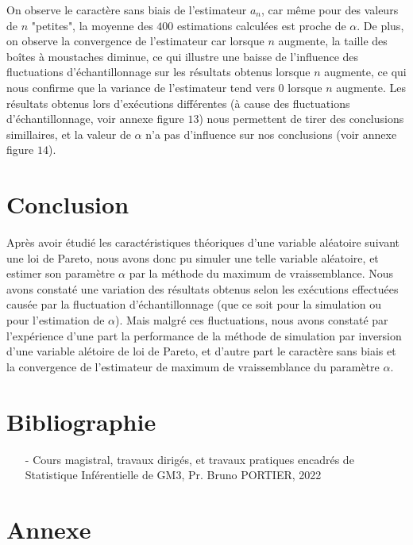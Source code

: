 \documentclass{article}
\begin{document}
On observe le caractère sans biais de l'estimateur $a_n$, car même pour des valeurs de $n$ "petites", la moyenne des $400$ estimations calculées est proche de $\alpha$. De plus, on observe la convergence de l'estimateur car lorsque $n$ augmente, la taille des boîtes à moustaches diminue, ce qui illustre une baisse de l'influence des fluctuations d'échantillonnage sur les résultats obtenus lorsque $n$ augmente, ce qui nous confirme que la variance de l'estimateur tend vers $0$ lorsque $n$ augmente. Les résultats obtenus lors d'exécutions différentes (à cause des fluctuations d'échantillonnage, voir annexe figure $13$) nous permettent de tirer des conclusions simillaires, et la valeur de $\alpha$ n'a pas d'influence sur nos conclusions (voir annexe figure $14$).

\pagebreak

\section{Conclusion}

Après avoir étudié les caractéristiques théoriques d'une variable aléatoire suivant une loi de Pareto, nous avons donc pu simuler une telle variable aléatoire, et estimer son paramètre $\alpha$ par la méthode du maximum de vraissemblance. Nous avons constaté une variation des résultats obtenus selon les exécutions effectuées causée par la fluctuation d'échantillonnage (que ce soit pour la simulation ou pour l'estimation de $\alpha$). Mais malgré ces fluctuations, nous avons constaté par l'expérience d'une part la performance de la méthode de simulation par inversion d'une variable alétoire de loi de Pareto, et d'autre part le caractère sans biais et la convergence de l'estimateur de maximum de vraissemblance du paramètre $\alpha$. 

\section{Bibliographie}

\begin{itemize}
\item[-] Cours magistral, travaux dirigés, et travaux pratiques encadrés de Statistique Inférentielle de GM3, Pr. Bruno PORTIER, 2022
\end{itemize}

\pagebreak

\section{Annexe}
\end{document}
